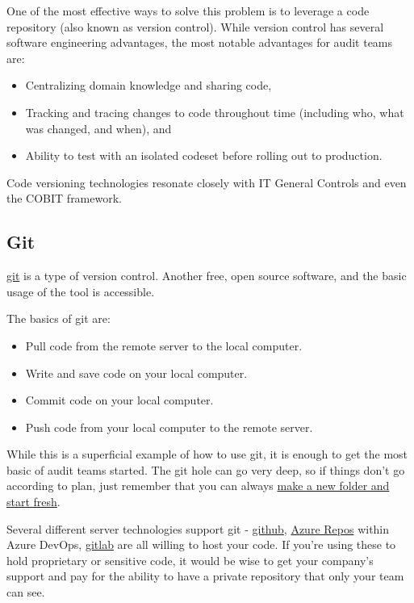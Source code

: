 \documentclass[
]{book}
\providecommand{\tightlist}{%
  \setlength{\itemsep}{0pt}\setlength{\parskip}{0pt}}
\begin{document}
One of the most effective ways to solve this problem is to leverage a code repository (also known as version control). While version control has several software engineering advantages, the most notable advantages for audit teams are:

\begin{itemize}
\tightlist
\item
  Centralizing domain knowledge and sharing code,
\item
  Tracking and tracing changes to code throughout time (including who, what was changed, and when), and
\item
  Ability to test with an isolated codeset before rolling out to production.
\end{itemize}

Code versioning technologies resonate closely with IT General Controls and even the COBIT framework.

\hypertarget{git}{%
\subsection{Git}\label{git}}

\href{https://git-scm.com}{git} is a type of version control. Another free, open source software, and the basic usage of the tool is accessible.

The basics of git are:

\begin{itemize}
\tightlist
\item
  Pull code from the remote server to the local computer.
\item
  Write and save code on your local computer.
\item
  Commit code on your local computer.
\item
  Push code from your local computer to the remote server.
\end{itemize}

While this is a superficial example of how to use git, it is enough to get the most basic of audit teams started. The git hole can go very deep, so if things don't go according to plan, just remember that you can always \href{https://xkcd.com/1597/}{make a new folder and start fresh}.

Several different server technologies support git - \href{https://github.com}{github}, \href{https://azure.microsoft.com/en-us/services/devops/repos/}{Azure Repos} within Azure DevOps, \href{https://gitlab.com}{gitlab} are all willing to host your code. If you're using these to hold proprietary or sensitive code, it would be wise to get your company's support and pay for the ability to have a private repository that only your team can see.
\end{document}
